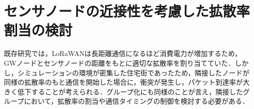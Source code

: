 \section{センサノードの近接性を考慮した拡散率割当の検討}
既存研究\cite{2017}では，LoRaWANは長距離通信になるほど消費電力が増加するため，GWノードとセンサノードの距離をもとに適切な拡散率を割り当てていた．しかし，シミュレーションの環境が密集した住宅街であったため，隣接したノードが同様の拡散率のもと通信を開始した場合に，衝突が発生し，パケット到達率が大きく低下することが考えられる．グループ化にも同様のことが言え，隣接したグループにおいて，拡散率の割当や通信タイミングの制御を検討する必要がある．